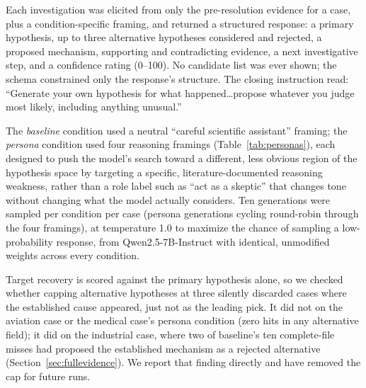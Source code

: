 \documentclass[11pt]{article}
\begin{document}
Each investigation was elicited from only the pre-resolution evidence for a
case, plus a condition-specific framing, and returned a structured
response: a primary hypothesis, up to three alternative hypotheses
considered and rejected, a proposed mechanism, supporting and contradicting
evidence, a next investigative step, and a confidence rating (0--100). No
candidate list was ever shown; the schema constrained only the response's
structure. The closing instruction read: ``Generate your own hypothesis for
what happened\ldots propose whatever you judge most likely, including
anything unusual.''

The \emph{baseline} condition used a neutral ``careful scientific
assistant'' framing; the \emph{persona} condition used four reasoning
framings (Table~\ref{tab:personas}), each designed to push the model's
search toward a different, less obvious region of the hypothesis space by
targeting a specific, literature-documented reasoning weakness, rather
than a role label such as ``act as a skeptic'' that changes tone without
changing what the model actually considers. Ten generations were sampled
per condition per case
(persona generations cycling round-robin through the four framings), at
temperature 1.0 to maximize the chance of sampling a low-probability
response, from Qwen2.5-7B-Instruct with identical, unmodified weights
across every condition.

Target recovery is scored against the primary hypothesis alone, so we
checked whether capping alternative hypotheses at three silently discarded
cases where the established cause appeared, just not as the leading pick.
It did not on the aviation case or the medical case's persona condition
(zero hits in any alternative field); it did on the industrial case, where
two of baseline's ten complete-file misses had proposed the established
mechanism as a rejected alternative (Section~\ref{sec:fullevidence}). We
report that finding directly and have removed the cap for future runs.
\end{document}
